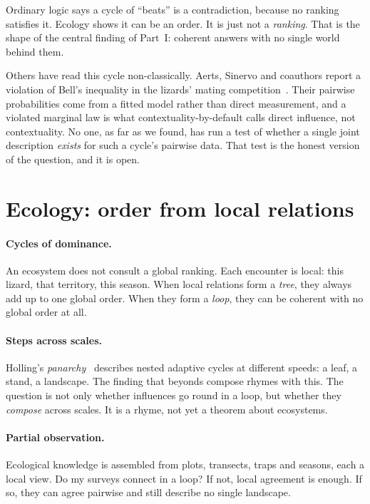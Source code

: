 \documentclass[11pt]{article}
\begin{document}
Ordinary logic says a cycle of ``beats'' is a contradiction, because no ranking
satisfies it. Ecology shows it can be an order. It is just not a
\emph{ranking}. That is the shape of the central finding of Part~I: coherent
answers with no single world behind them.

Others have read this cycle non-classically. Aerts, Sinervo and coauthors
report a violation of Bell's inequality in the lizards' mating
competition~\cite{aerts2014}. Their pairwise probabilities come from a fitted
model rather than direct measurement, and a violated marginal law is what
contextuality-by-default calls direct influence, not contextuality. No one, as
far as we found, has run a test of whether a single joint description
\emph{exists} for such a cycle's pairwise data. That test is the honest version
of the question, and it is open.

\section{Ecology: order from local relations}
\paragraph{Cycles of dominance.} An ecosystem does not consult a global
ranking. Each encounter is local: this lizard, that territory, this season.
When local relations form a \emph{tree}, they always add up to one global order.
When they form a \emph{loop}, they can be coherent with no global order at all.

\paragraph{Steps across scales.} Holling's \emph{panarchy}~\cite{panarchy2002}
describes nested adaptive cycles at different speeds: a leaf, a stand, a
landscape. The finding that beyonds compose rhymes with this. The question is not
only whether influences go round in a loop, but whether they \emph{compose}
across scales. It is a rhyme, not yet a theorem about ecosystems.

\paragraph{Partial observation.} Ecological knowledge is assembled from plots,
transects, traps and seasons, each a local view. Do my surveys connect in a
loop? If not, local agreement is enough. If so, they can agree pairwise and
still describe no single landscape.
\end{document}
